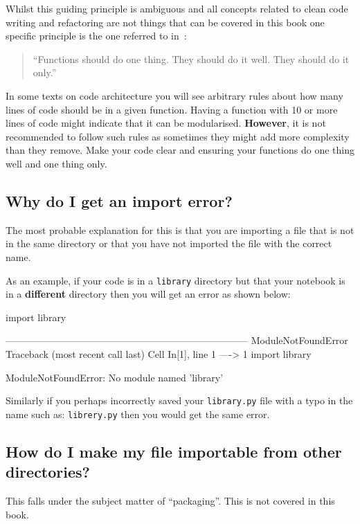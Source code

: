 Whilst this guiding principle is ambiguous and all concepts related to clean
code writing and refactoring are not things that can be covered in this book one
specific principle is the one referred to in~\cite{martin2009clean}:

\begin{quote}
``Functions should do one thing. They should do it well. They should do it
only.''
\end{quote}



In some texts on code architecture you will see arbitrary rules about how many
lines of code should be in a given function. Having a function with 10 or more
lines of code might indicate that it can be modularised. \textbf{However}, it is
not
recommended to follow such rules as sometimes they might add more complexity than
they remove. Make your code clear and
ensuring your functions do one thing well and one thing only.


\subsection{Why do I get an import error?}
\label{\detokenize{building-tools/05-modularisation/why/main:why-do-i-get-an-import-error}}

The most probable explanation for this is that you are importing a file that is
not in the same directory or that you have not imported the file with the
correct name.


As an example, if your code is in a \texttt{library} directory but that your
notebook is in a \textbf{different} directory then you will get an error as shown
below:

\begin{pyin}
import library
\end{pyin}





\begin{raw}
---------------------------------------------------------------------------
ModuleNotFoundError                       Traceback (most recent call last)
Cell In[1], line 1
----> 1 import library

ModuleNotFoundError: No module named 'library'
\end{raw}






Similarly if you perhaps incorrectly saved your \texttt{library.py} file with a typo in
the name such as: \texttt{librery.py} then you would get the same error.


\subsection{How do I make my file importable from other directories?}
\label{\detokenize{building-tools/05-modularisation/why/main:how-do-i-make-my-file-importable-from-other-directories}}

This falls under the subject matter of ``packaging''. This is not covered in
this book.
